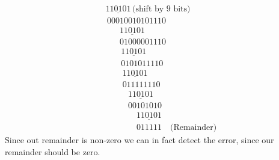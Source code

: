 \documentclass{article}
\begin{document}
\begin{enumerate}
\begin{align*}
                & \, \, \underline{110101} \, \text{(shift by 9 bits)} \\[-10pt]
                & \, \, \, 00010010101110 \\[-10pt]
                & \qquad \underline{110101} \\[-10pt]
                & \qquad 01000001110 \\[-10pt]
                & \qquad \, \underline{110101} \\[-10pt]
                & \qquad \, 0101011110 \\[-10pt]
                & \qquad \, \, \underline{110101} \\[-10pt]
                & \qquad \, \, 011111110 \\[-10pt]
                & \qquad \quad \underline{110101} \\[-10pt]
                & \qquad \quad 00101010 \\[-10pt]
                & \qquad \qquad \underline{110101} \\[-10pt]
                & \qquad \qquad 011111 \quad \text{(Remainder)}
    \end{align*}
    Since out remainder is non-zero we can in fact detect the error, since our remainder should be zero.
    
\end{enumerate}
\end{document}
